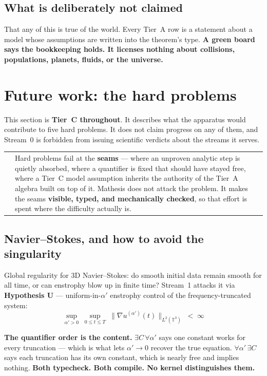 \documentclass[11pt,a4paper]{article}
\makeatletter
\newcommand{\caveat}[1]{%
  \par\vspace{0.6em}\noindent
  \begin{tabular}{@{}p{0.4em}@{\hspace{0.8em}}p{\dimexpr\linewidth-2.2em\relax}@{}}
  \textcolor{rulegray}{\rule{2pt}{\baselineskip}} & \small #1
  \end{tabular}\par\vspace{0.6em}}
\makeatother
\begin{document}
\subsection{What is deliberately not claimed}

That any of this is true of the world. Every Tier~A row is a statement about a model whose
assumptions are written into the theorem's type. \textbf{A green board says the bookkeeping
holds. It licenses nothing about collisions, populations, planets, fluids, or the universe.}

\section{Future work: the hard problems}

This section is \textbf{Tier~C throughout}. It describes what the apparatus would contribute to
five hard problems. It does not claim progress on any of them, and Stream~0 is forbidden from
issuing scientific verdicts about the streams it serves.

\caveat{Hard problems fail at the \textbf{seams} — where an unproven analytic step is quietly
absorbed, where a quantifier is fixed that should have stayed free, where a Tier~C model
assumption inherits the authority of the Tier~A algebra built on top of it. Mathesis does not
attack the problem. It makes the seams \textbf{visible, typed, and mechanically checked}, so that
effort is spent where the difficulty actually is.}

\subsection{Navier–Stokes, and how to avoid the singularity}

Global regularity for 3D Navier–Stokes: do smooth initial data remain smooth for all time, or can
enstrophy blow up in finite time? Stream~1 attacks it via \textbf{Hypothesis U} — uniform-in-$\alpha'$
enstrophy control of the frequency-truncated system:
\[
  \sup_{\alpha' > 0}\; \sup_{0 \le t \le T}\; \bigl\| \nabla u^{(\alpha')}(t) \bigr\|_{L^2(\mathbb{T}^3)} \;<\; \infty
\]

\textbf{The quantifier order is the content.} $\exists C\,\forall\alpha'$ says one constant works
for every truncation — which is what lets $\alpha' \to 0$ recover the true equation.
$\forall\alpha'\,\exists C$ says each truncation has its own constant, which is nearly free and
implies nothing. \textbf{Both typecheck. Both compile. No kernel distinguishes them.}
\end{document}
